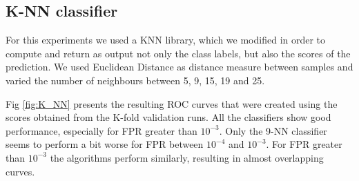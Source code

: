 \subsection{K-NN classifier}
\noindent For this experiments we used a KNN library, which we modified in order to compute and return as output not only the class labels, but also the scores of the prediction.
We used Euclidean Distance as distance measure between samples and varied the number of neighbours between 5, 9, 15, 19 and 25. 

\noindent Fig \ref{fig:K_NN} presents the resulting ROC curves that were created using the scores obtained from the K-fold validation runs. All the classifiers show good performance, especially for FPR greater than $10^{-3}$. Only the 9-NN classifier seems to perform a bit worse for FPR between $10^{-4}$ and $10^{-3}$. For FPR greater than  $10^{-3}$
the algorithms perform similarly, resulting in almost overlapping curves.

